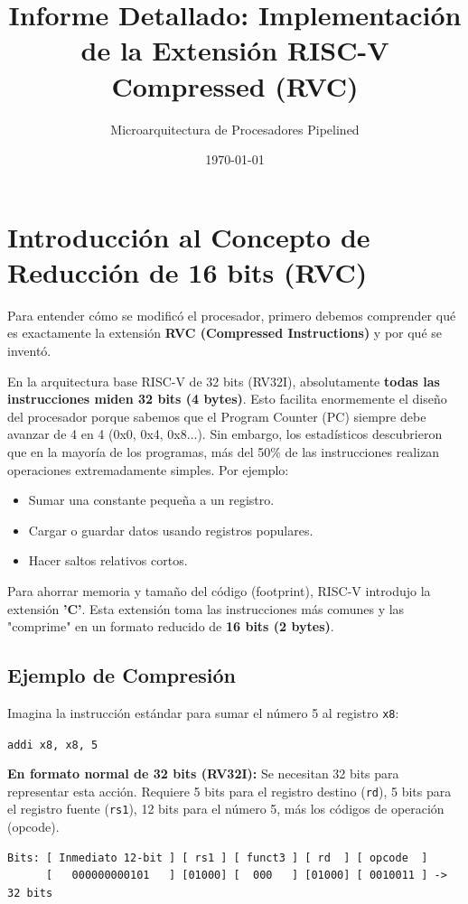 \documentclass[12pt, a4paper]{article}
\title{\textbf{Informe Detallado: Implementaci\'on de la Extensi\'on RISC-V Compressed (RVC)}}
\author{Microarquitectura de Procesadores Pipelined}
\date{\today}
\begin{document}
\maketitle
\tableofcontents
\newpage

\section{Introducci\'on al Concepto de Reducci\'on de 16 bits (RVC)}

Para entender c\'omo se modific\'o el procesador, primero debemos comprender qu\'e es exactamente la extensi\'on \textbf{RVC (Compressed Instructions)} y por qu\'e se invent\'o.

En la arquitectura base RISC-V de 32 bits (RV32I), absolutamente \textbf{todas las instrucciones miden 32 bits (4 bytes)}. Esto facilita enormemente el dise\~no del procesador porque sabemos que el Program Counter (PC) siempre debe avanzar de 4 en 4 (0x0, 0x4, 0x8...). Sin embargo, los estad\'isticos descubrieron que en la mayor\'ia de los programas, m\'as del 50\% de las instrucciones realizan operaciones extremadamente simples. Por ejemplo:
\begin{itemize}
    \item Sumar una constante peque\~na a un registro.
    \item Cargar o guardar datos usando registros populares.
    \item Hacer saltos relativos cortos.
\end{itemize}

Para ahorrar memoria y tama\~no del c\'odigo (footprint), RISC-V introdujo la extensi\'on \textbf{'C'}. Esta extensi\'on toma las instrucciones m\'as comunes y las "comprime" en un formato reducido de \textbf{16 bits (2 bytes)}. 

\subsection{Ejemplo de Compresi\'on}
Imagina la instrucci\'on est\'andar para sumar el n\'umero 5 al registro \texttt{x8}:
\begin{center}
    \texttt{addi x8, x8, 5}
\end{center}

\textbf{En formato normal de 32 bits (RV32I):}
Se necesitan 32 bits para representar esta acci\'on. Requiere 5 bits para el registro destino (\texttt{rd}), 5 bits para el registro fuente (\texttt{rs1}), 12 bits para el n\'umero 5, m\'as los c\'odigos de operaci\'on (opcode).
\begin{verbatim}
Bits: [ Inmediato 12-bit ] [ rs1 ] [ funct3 ] [ rd  ] [ opcode  ]
      [   000000000101   ] [01000] [  000   ] [01000] [ 0010011 ] -> 32 bits
\end{verbatim}
\end{document}
